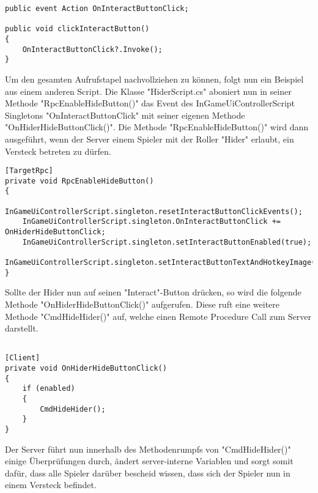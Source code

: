 \begin{lstlisting}[caption= InGameUiControllerScript.cs OnInteractButtonClick Event]
public event Action OnInteractButtonClick;	

public void clickInteractButton()
{
	OnInteractButtonClick?.Invoke();
}
\end{lstlisting}

Um den gesamten Aufrufstapel\cite{Wikipedia.2021k} nachvollziehen zu können, folgt nun ein Beispiel aus einem anderen Script.
Die Klasse "HiderScript.cs" aboniert nun in seiner Methode "RpcEnableHideButton()" das Event des InGameUiControllerScript Singletons "OnInteractButtonClick" mit seiner eigenen Methode "OnHiderHideButtonClick()". Die Methode "RpcEnableHideButton()" wird dann ausgeführt, wenn der Server einem Spieler mit der Roller "Hider" erlaubt, ein Versteck betreten zu dürfen.

\begin{lstlisting}[caption= HiderScript.cs Subscribe to InGameUiControllerScript Event]
[TargetRpc]
private void RpcEnableHideButton()
{
	InGameUiControllerScript.singleton.resetInteractButtonClickEvents();
	InGameUiControllerScript.singleton.OnInteractButtonClick += OnHiderHideButtonClick;
	InGameUiControllerScript.singleton.setInteractButtonEnabled(true);
	InGameUiControllerScript.singleton.setInteractButtonTextAndHotkeyImage("Hide");
}
\end{lstlisting}

Sollte der Hider nun auf seinen "Interact"-Button drücken, so wird die folgende Methode "OnHiderHideButtonClick()" aufgerufen. Diese ruft eine weitere Methode "CmdHideHider()" auf, welche einen Remote Procedure Call\cite{.05.02.2022} zum Server darstellt.

\begin{lstlisting}[caption= HiderScript.csOnHiderHideButtonClick() Method]

[Client]
private void OnHiderHideButtonClick()
{
	if (enabled)
	{
		CmdHideHider();
	}
}

\end{lstlisting}

Der Server führt nun innerhalb des Methodenrumpfs von "CmdHideHider()" einige Überprüfungen durch, ändert server-interne Variablen und sorgt somit dafür, dass alle Spieler darüber bescheid wissen, dass sich der Spieler nun in einem Versteck befindet.

